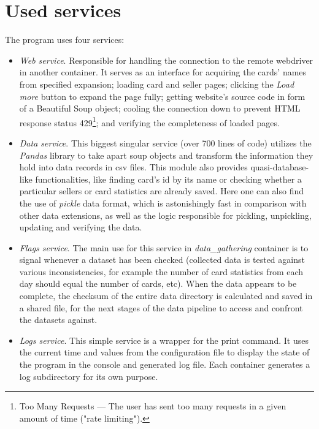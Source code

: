 \section{Used services}
\label{s:used_services}
The program uses four services:
\begin{itemize}
      \item \textit{Web service}.
            Responsible for handling the connection to the remote webdriver in another container. It serves as an interface for acquiring the cards' names from specified expansion; loading card and seller pages; clicking the \textit{Load more} button to expand the page fully; getting website's source code in form of a Beautiful Soup object; cooling the connection down to prevent HTML response status 429\footnote{Too  Many Requests --- The user has sent too many requests in a given amount of time ("rate limiting").}; and verifying the completeness of loaded pages.

      \item \textit{Data service}.
            This biggest singular service (over 700 lines of code) utilizes the \textit{Pandas} library to take apart soup objects and transform the information they hold into data records in csv files. This module also provides quasi-database-like functionalities, like finding card's id by its name or checking whether a particular sellers or card statistics are already saved. Here one can also find the use of \textit{pickle} data format, which is astonishingly fast in comparison with other data extensions, as well as the logic responsible for pickling, unpickling, updating and verifying the data.

      \item \textit{Flags service}.
            The main use for this service in \textit{data\_gathering} container is to signal whenever a dataset has been checked (collected data is tested against various inconsistencies, for example the number of card statistics from each day should equal the number of cards, etc). When the data appears to be complete, the checksum of the entire data directory is calculated and saved in a shared file, for the next stages of the data pipeline to access and confront the datasets against.

      \item \textit{Logs service}.
            This simple service is a wrapper for the print command. It uses the current time and values from the configuration file to display the state of the program in the console and generated log file. Each container generates a log subdirectory for its own purpose.
\end{itemize}

